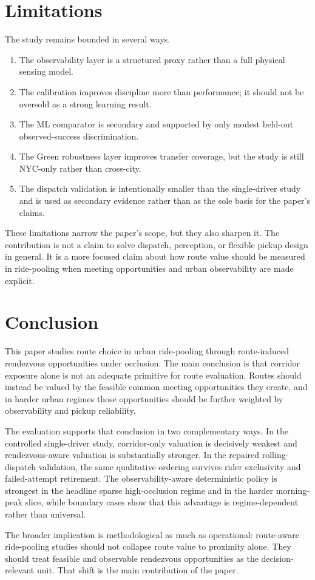 \documentclass[journal]{IEEEtran}
\begin{document}
\section{Limitations}
The study remains bounded in several ways.
\begin{enumerate}
\item The observability layer is a structured proxy rather than a full physical sensing model.
\item The calibration improves discipline more than performance; it should not be oversold as a strong learning result.
\item The ML comparator is secondary and supported by only modest held-out observed-success discrimination.
\item The Green robustness layer improves transfer coverage, but the study is still NYC-only rather than cross-city.
\item The dispatch validation is intentionally smaller than the single-driver study and is used as secondary evidence rather than as the sole basis for the paper's claims.
\end{enumerate}

These limitations narrow the paper's scope, but they also sharpen it. The contribution is not a claim to solve dispatch, perception, or flexible pickup design in general. It is a more focused claim about how route value should be measured in ride-pooling when meeting opportunities and urban observability are made explicit.

\section{Conclusion}
This paper studies route choice in urban ride-pooling through route-induced rendezvous opportunities under occlusion. The main conclusion is that corridor exposure alone is not an adequate primitive for route evaluation. Routes should instead be valued by the feasible common meeting opportunities they create, and in harder urban regimes those opportunities should be further weighted by observability and pickup reliability.

The evaluation supports that conclusion in two complementary ways. In the controlled single-driver study, corridor-only valuation is decisively weakest and rendezvous-aware valuation is substantially stronger. In the repaired rolling-dispatch validation, the same qualitative ordering survives rider exclusivity and failed-attempt retirement. The observability-aware deterministic policy is strongest in the headline sparse high-occlusion regime and in the harder morning-peak slice, while boundary cases show that this advantage is regime-dependent rather than universal.

The broader implication is methodological as much as operational: route-aware ride-pooling studies should not collapse route value to proximity alone. They should treat feasible and observable rendezvous opportunities as the decision-relevant unit. That shift is the main contribution of the paper.



\end{document}
